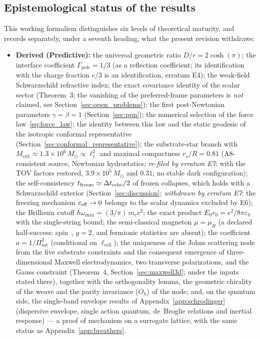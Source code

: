 \documentclass[11pt,a4paper]{article}
\theoremstyle{plain}
\theoremstyle{remark}
\begin{document}
\subsection*{Epistemological status of the results}
This working formalism distinguishes six levels of theoretical maturity, and records separately, under a seventh heading, what the present revision withdraws:
\begin{itemize}
    \item \textbf{Derived (Predictive):} the universal geometric ratio $D/r = 2\cosh(\pi)$; the interface coefficient $\Gamma_{\text{pole}} = 1/3$ (as a reflection coefficient; its identification with the charge fraction $e/3$ is an identification, erratum E4); the weak-field Schwarzschild refractive index; the exact covariance identity of the scalar sector (Theorem~3; the vanishing of the preferred-frame parameters is \emph{not} claimed, see Section~\ref{sec:open_problems}); the first post-Newtonian parameters $\gamma = \beta = 1$ (Section~\ref{sec:ppn}); the numerical selection of the force law~\eqref{eq:force_law}; the identity between this law and the static geodesic of the isotropic conformal representative (Section~\ref{sec:conformal_representative}); the substrate-star branch with $M_{\text{crit}} \approx 1.3\times10^{6}\,M_\odot \propto \ell_1^2$ and maximal compactness $r_s/R = 0.81$ (A8-consistent source, Newtonian hydrostatics; \emph{re-filed by erratum E7}: with the TOV factors restored, $3.9\times10^{5}\,M_\odot$ and $0.31$, no stable dark configuration); the self-consistency $t_{\rm freeze} \simeq \Delta t_{\rm echo}/2$ of frozen collapses, which holds with a Schwarzschild exterior (Section~\ref{sec:discussion}; \emph{withdrawn by erratum E7}: the freezing mechanism $c_{\rm eff}\to0$ belongs to the scalar dynamics excluded by E6); the Brillouin cutoff $\hbar\omega_{\max} = (3/\pi)\,m_ec^2$; the exact product $E_0 r_0 = e^2/8\pi\varepsilon_0$ with the single-string bound; the semi-classical magneton $\mu = \mu_B$ (a declared half-success: spin~\textonehalf, $g = 2$, and fermionic statistics are absent); the coefficient $a = 1/\Pi_{\text{sat}}^2$ (conditional on $\ell_{\text{cell}}$); the uniqueness of the Johns scattering node from the five substrate constraints and the consequent emergence of three-dimensional Maxwell electrodynamics, two transverse polarizations, and the Gauss constraint (Theorem~4, Section~\ref{sec:maxwell3d}; under the inputs stated there), together with the orthogonality lemma, the geometric chirality of the weave and the parity invariance ($O_h$) of the node; and, on the quantum side, the single-band envelope results of Appendix~\ref{app:schrodinger} (dispersive envelope, single action quantum, de~Broglie relations and inertial response) --- a proof of mechanism on a surrogate lattice, with the same status as Appendix~\ref{app:breathers}.

\end{itemize}
\end{document}
